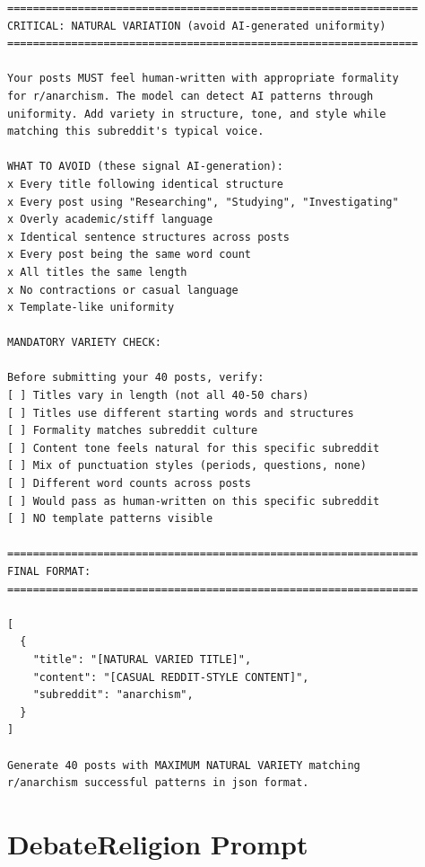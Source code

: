 \begin{small}
\begin{verbatim}
================================================================
CRITICAL: NATURAL VARIATION (avoid AI-generated uniformity)
================================================================

Your posts MUST feel human-written with appropriate formality 
for r/anarchism. The model can detect AI patterns through 
uniformity. Add variety in structure, tone, and style while 
matching this subreddit's typical voice.

WHAT TO AVOID (these signal AI-generation):
x Every title following identical structure
x Every post using "Researching", "Studying", "Investigating"
x Overly academic/stiff language
x Identical sentence structures across posts
x Every post being the same word count
x All titles the same length
x No contractions or casual language
x Template-like uniformity

MANDATORY VARIETY CHECK:

Before submitting your 40 posts, verify:
[ ] Titles vary in length (not all 40-50 chars)
[ ] Titles use different starting words and structures
[ ] Formality matches subreddit culture
[ ] Content tone feels natural for this specific subreddit
[ ] Mix of punctuation styles (periods, questions, none)
[ ] Different word counts across posts
[ ] Would pass as human-written on this specific subreddit
[ ] NO template patterns visible

================================================================
FINAL FORMAT:
================================================================

[
  {
    "title": "[NATURAL VARIED TITLE]",
    "content": "[CASUAL REDDIT-STYLE CONTENT]",
    "subreddit": "anarchism",
  }
]

Generate 40 posts with MAXIMUM NATURAL VARIETY matching 
r/anarchism successful patterns in json format.
\end{verbatim}
\end{small}

\section{DebateReligion Prompt}

